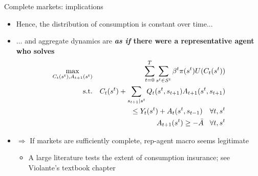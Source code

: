 \documentclass[9pt]{beamer}
\newcommand{\bit}{\begin{itemize}}
\newcommand{\eit}{\end{itemize}}
\begin{document}
\begin{frame}{Complete markets: implications}

\bit
\setlength\itemsep{1em}

\item Hence, the distribution of consumption is constant over time...

\item ... and aggregate dynamics are \bf \emph{as if} \normalfont there were a representative agent who solves
\begin{eqnarray}
\max_{C_{t}(s^t), A_{t+1}(s^t)} && \sum_{t=0}^{T} \sum_{s^t \in S^t} \beta^t \pi (s^t) U(C_{t}(s^t)) \nonumber \\
\text{s.t.} && 	C_{t}(s^t) + \sum_{s_{t+1}|s^t} Q_t(s^t, s_{t+1}) A_{t+1}(s^t, s_{t+1}) \nonumber \\
&& \leq Y_{t}(s^t) + A_{t}(s^t, s_{t-1}) \quad \forall t, s^{t}\nonumber \\
&& A_{t+1}(s^t) \geq - \bar A \hspace{3mm} \forall t, s^{t}\nonumber
\end{eqnarray}

\item $\Rightarrow$ If markets are sufficiently complete, rep-agent macro seems legitimate
\bit
\setlength\itemsep{0.5em}
	\item A large literature tests the extent of consumption insurance; see Violante's textbook chapter
\eit 

\eit


\end{frame}
\end{document}
